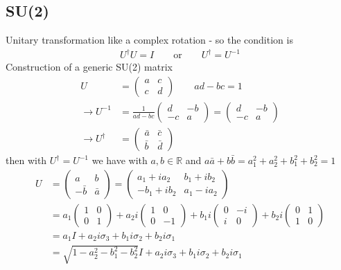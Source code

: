 \documentclass[../main.tex]{subfiles}
\begin{document}
\subsection{SU(2)}
Unitary transformation like a complex rotation - so the condition is
\begin{align*}
U^\dagger U=I\qquad \text{or}\qquad U^\dagger=U^{-1}
\end{align*}
Construction of a generic SU(2) matrix
\begin{align*}
U&=\left(
\begin{matrix}
a & c\\
c & d
\end{matrix}
\right)\qquad ad-bc=1\\
\rightarrow U^{-1}&=\frac{1}{ad-bc}\left(
\begin{matrix}
d & -b\\
-c & a
\end{matrix}
\right)=\left(\begin{matrix}
d & -b\\
-c & a
\end{matrix}
\right)\\
\rightarrow U^\dagger&=\left(
\begin{matrix}
\bar{a} & \bar{c}\\
\bar{b} & \bar{d}
\end{matrix}
\right)
\end{align*}
then with $U^\dagger=U^{-1}$ we have with $a,b \in \mathbb{R}$ and $a\bar{a}+b\bar{b}=a_1^2+a_2^2+b_1^2+b_2^2=1$
\begin{align*}
U&=\left(\begin{matrix}
a & b\\
-\bar{b} & \bar{a}
\end{matrix}
\right)
=\left(\begin{matrix}
a_1+ia_2 & b_1+ib_2\\
-b_1+ib_2 & a_1-ia_2
\end{matrix}
\right)\\
&=a_1\left(\begin{matrix}
1 & 0\\
0 & 1
\end{matrix}
\right)+
a_2i\left(\begin{matrix}
1 & 0\\
0 & -1
\end{matrix}
\right)+
b_1i\left(\begin{matrix}
0 & -i\\
i & 0
\end{matrix}
\right)
+
b_2i\left(\begin{matrix}
0 & 1\\
1 & 0
\end{matrix}
\right)\\
&=a_1I+a_2 i\sigma_3+b_1i\sigma_2+b_2i\sigma_1\\
&=\sqrt{1-a_2^2-b_1^2-b_2^2}I+a_2 i\sigma_3+b_1i\sigma_2+b_2i\sigma_1
\end{align*}
\end{document}
